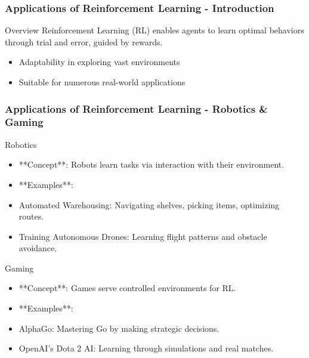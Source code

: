 \documentclass[aspectratio=169]{beamer}
\begin{document}
\begin{frame}[fragile]
    \frametitle{Applications of Reinforcement Learning - Introduction}
    \begin{block}{Overview}
        Reinforcement Learning (RL) enables agents to learn optimal behaviors through trial and error, guided by rewards.
    \end{block}
    \begin{itemize}
        \item Adaptability in exploring vast environments
        \item Suitable for numerous real-world applications
    \end{itemize}
\end{frame}

\begin{frame}[fragile]
    \frametitle{Applications of Reinforcement Learning - Robotics \& Gaming}
    \begin{block}{Robotics}
        \begin{itemize}
            \item **Concept**: Robots learn tasks via interaction with their environment.
            \item **Examples**:
                \item Automated Warehousing: Navigating shelves, picking items, optimizing routes.
                \item Training Autonomous Drones: Learning flight patterns and obstacle avoidance.
        \end{itemize}
    \end{block}
    
    \begin{block}{Gaming}
        \begin{itemize}
            \item **Concept**: Games serve controlled environments for RL.
            \item **Examples**:
                \item AlphaGo: Mastering Go by making strategic decisions.
                \item OpenAI’s Dota 2 AI: Learning through simulations and real matches.
        \end{itemize}
    \end{block}
\end{frame}
\end{document}
